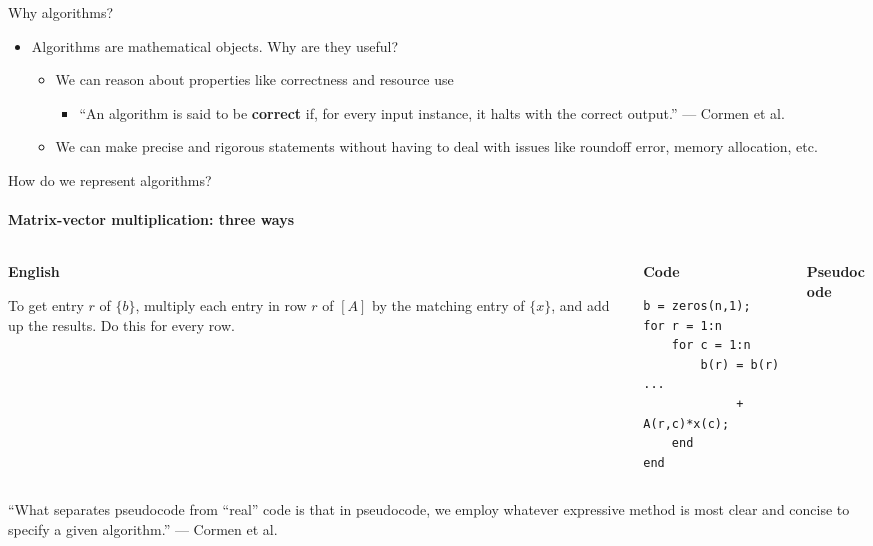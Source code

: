 \documentclass[aspectratio=169]{beamer}
\begin{document}
\begin{frame}{Why algorithms?}
  \begin{itemize}
    \item Algorithms are mathematical objects. Why are they useful?
        \pause
      \begin{itemize}
        \item We can reason about properties like correctness and resource
          use
          \pause
          \begin{itemize}
            \item[] ``An algorithm is said to be \textbf{correct} if, for
              every input instance, it halts with the correct output.'' --- Cormen et al.
          \end{itemize}
        \pause
        \item We can make precise and rigorous statements without having to
          deal with issues like roundoff error, memory allocation, etc.
      \end{itemize}
  \end{itemize}
\end{frame}

\begin{frame}[fragile]{How do we represent algorithms?}
  \framesubtitle{Matrix-vector multiplication: three ways}
  \begin{columns}[T]
    \begin{column}{0.30\textwidth}
      \centering\textbf{English}\par\vspace{0.5em}
      \raggedright\small
      To get entry $r$ of $\{b\}$, multiply each entry in row $r$ of $[A]$
      by the matching entry of $\{x\}$, and add up the results.
      Do this for every row.
    \end{column}
    \begin{column}{0.32\textwidth}
      \centering\textbf{Code}\par\vspace{0.5em}
\begin{lstlisting}[style=matlab]
b = zeros(n,1);
for r = 1:n
    for c = 1:n
        b(r) = b(r) ...
             + A(r,c)*x(c);
    end
end
\end{lstlisting}
    \end{column}
    \begin{column}{0.34\textwidth}
      \centering\textbf{Pseudocode}\par\vspace{0.5em}
      {\scriptsize}
    \end{column}
  \end{columns}
  \vfill
  {\small ``What separates pseudocode from ``real'' code is that in
  pseudocode, we employ whatever expressive method is most clear and concise
  to specify a given algorithm.'' --- Cormen et al.}
\end{frame}
\end{document}
